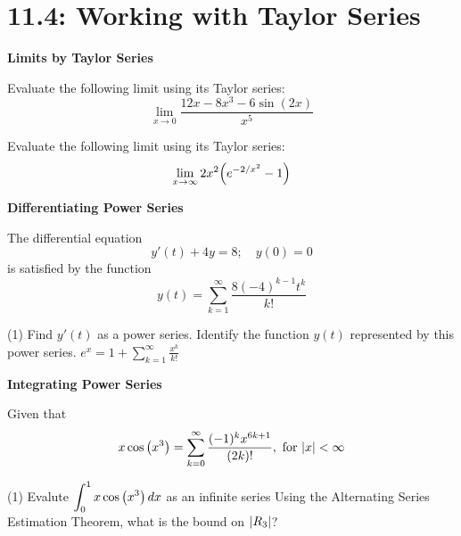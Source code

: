 \documentclass[../mathNotesPreamble]{subfiles}
\begin{document}
  \section{11.4: Working with Taylor Series}
  \mbox{}

    \textbf{Limits by Taylor Series}
      \begin{ex*}[\textcolor{blue}{LC 31.1-31.2}]
        Evaluate the following limit using its Taylor series:
          \[\lim_{x\to 0} \frac{12x-8x^3-6\sin(2x)}{x^5}\]
      \end{ex*}
      \pagebreak

      \begin{ex*}
        Evaluate the following limit using its Taylor series:
          \[\lim_{x\to \infty} 2x^2{\left(e^{-2/x^2}-1\right)}\]
      \end{ex*}
      \pagebreak

    \textbf{Differentiating Power Series}
      \begin{ex*}[\textcolor{blue}{LC 31.3-31.4}]
        The differential equation
          \[y'(t)+4y=8;\quad y(0)=0\]
        is satisfied by the function
          \[y(t)=\sum_{k=1}^\infty \frac{8(-4)^{k-1}t^k}{k!}\]
      \end{ex*}
      \begin{tasks}[after-item-skip=\stretch{1}, label=,item-indent=0pt](1)
        \task Find $y'(t)$ as a power series.
        \task Identify the function $y(t)$ represented by this power series.  $e^x=1+\displaystyle\sum_{k=1}^\infty \frac{x^k}{k!}$
      \end{tasks}
      \pagebreak

    \textbf{Integrating Power Series}
      \begin{ex*}[\textcolor{blue}{LC 31.5-31.6}]
        Given that
          \[x\cos{\left(x^3\right)}=\sum_{k=0}^\infty \frac{(-1)^k x^{6k+1}}{(2k)!},\textnormal{ for } {\left\vert x\right\vert}<\infty\]
      \end{ex*}
      \begin{tasks}[after-item-skip=\stretch{1}, label=,item-indent=0pt](1)
        \task Evalute $\displaystyle\int_0^1 x\cos{\left(x^3\right)}\,dx$ as an infinite series
        \task Using the Alternating Series Estimation Theorem, what is the bound on ${\left\vert R_3\right\vert}$?
      \end{tasks}
      \pagebreak
\end{document}
